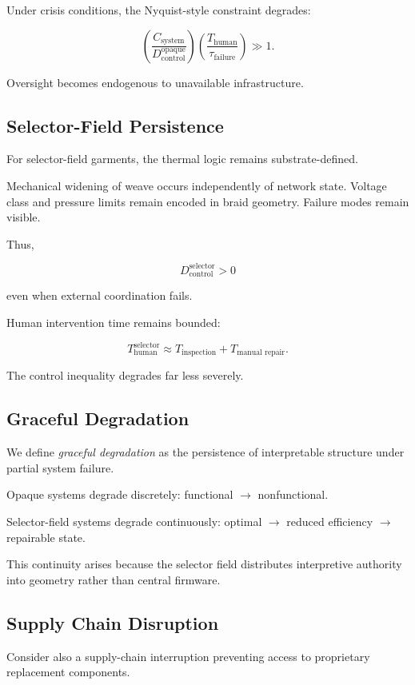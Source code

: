 \documentclass[11pt]{article}
\begin{document}
Under crisis conditions, the Nyquist-style constraint degrades:

\[
\left( \frac{C_{\text{system}}}{D_{\text{control}}^{\text{opaque}}} \right)
\left( \frac{T_{\text{human}}}{\tau_{\text{failure}}} \right) \gg 1.
\]

Oversight becomes endogenous to unavailable infrastructure.

\subsection{Selector-Field Persistence}

For selector-field garments, the thermal logic remains substrate-defined.

Mechanical widening of weave occurs independently of network state.
Voltage class and pressure limits remain encoded in braid geometry.
Failure modes remain visible.

Thus,

\[
D_{\text{control}}^{\text{selector}} > 0
\]

even when external coordination fails.

Human intervention time remains bounded:

\[
T_{\text{human}}^{\text{selector}} \approx T_{\text{inspection}} + T_{\text{manual repair}}.
\]

The control inequality degrades far less severely.

\subsection{Graceful Degradation}

We define \emph{graceful degradation} as the persistence of interpretable 
structure under partial system failure.

Opaque systems degrade discretely: functional $\rightarrow$ nonfunctional.

Selector-field systems degrade continuously: optimal $\rightarrow$ reduced efficiency $\rightarrow$ repairable state.

This continuity arises because the selector field distributes interpretive 
authority into geometry rather than central firmware.

\subsection{Supply Chain Disruption}

Consider also a supply-chain interruption preventing access to proprietary 
replacement components.
\end{document}
